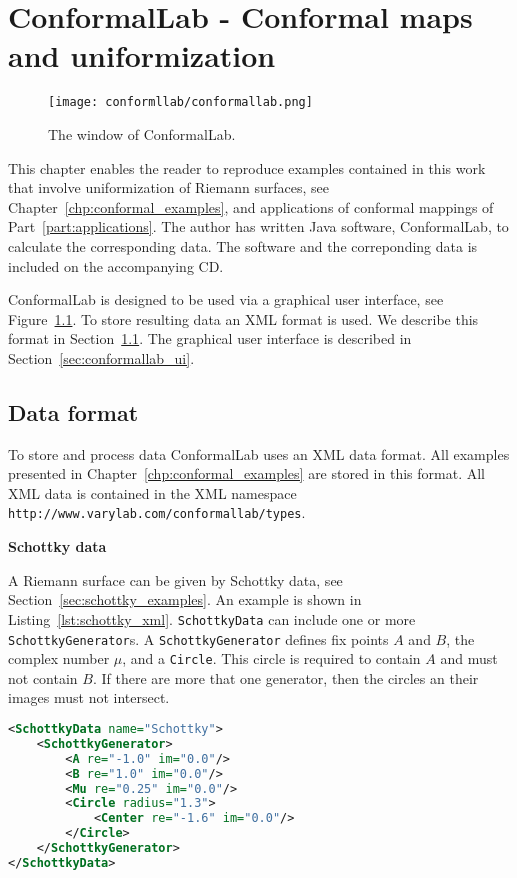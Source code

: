 \documentclass[Thesis.tex]{subfiles}
\begin{document}
\chapter{{\sc ConformalLab} - Conformal maps and uniformization}
\label{chp:conformallab}

\begin{figure}
\centering
\texttt{[image: conformllab/conformallab.png]}
\caption{The window of {\sc ConformalLab}.}
\label{fig:conformal_window}
\end{figure}

This chapter enables the reader to reproduce examples contained in this work that involve uniformization of
Riemann surfaces, see Chapter~\ref{chp:conformal_examples}, and applications of conformal mappings of 
Part~\ref{part:applications}. The author has written {\sc Java} software, {\sc ConformalLab}, to calculate the corresponding data.
The software and the correponding data is included on the accompanying CD. 

{\sc ConformalLab} is designed to be used via a graphical user interface, see Figure~\ref{fig:conformal_window}. To store
resulting data an XML format is used. We describe this format in Section~\ref{sec:conformal_data}. The graphical user interface
is described in Section~\ref{sec:conformallab_ui}.


\section{Data format}
\label{sec:conformal_data}
To store and process data {\sc ConformalLab} uses an {\sc XML} data format.
All examples presented in Chapter~\ref{chp:conformal_examples} are stored
in this format. 
All XML data is contained in the XML namespace 
{\tt http://www.varylab.com/conformallab/types}.


{\bf Schottky data} 

A Riemann surface can be given by Schottky data, see Section~\ref{sec:schottky_examples}. An example is shown in Listing~\ref{lst:schottky_xml}. {\tt SchottkyData} can include one or more {\tt SchottkyGenerator}s. A {\tt SchottkyGenerator} defines fix points $A$ and $B$, the complex number $\mu$, and a {\tt Circle}. This circle is required to contain $A$ and must not contain $B$. If there are more that one generator, then the circles
an their images must not intersect.

\begin{lstlisting}[label=lst:schottky_xml, caption={A torus given by schotty data}, numbers=none, language=XML, captionpos=b]
<SchottkyData name="Schottky">
	<SchottkyGenerator>
		<A re="-1.0" im="0.0"/>
		<B re="1.0" im="0.0"/>
		<Mu re="0.25" im="0.0"/>
		<Circle radius="1.3">
			<Center re="-1.6" im="0.0"/>
		</Circle>
	</SchottkyGenerator>
</SchottkyData>
\end{lstlisting}
\end{document}
